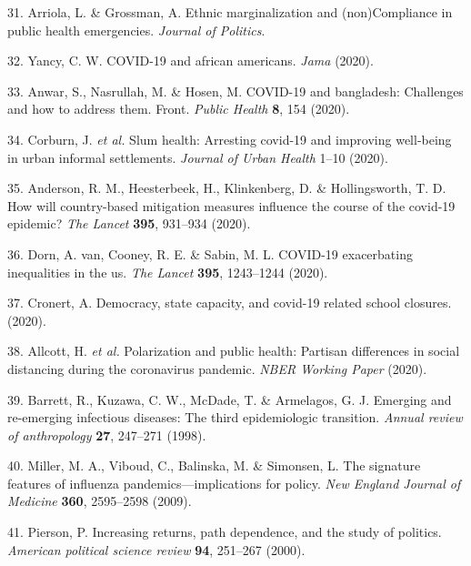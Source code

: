 \documentclass[]{article}
\begin{document}
\begin{cslreferences}
\leavevmode\hypertarget{ref-arriola2020}{}%
31. Arriola, L. \& Grossman, A. Ethnic marginalization and (non)Compliance in public health emergencies. \emph{Journal of Politics}.

\leavevmode\hypertarget{ref-yancy2020covid}{}%
32. Yancy, C. W. COVID-19 and african americans. \emph{Jama} (2020).

\leavevmode\hypertarget{ref-anwar2020covid}{}%
33. Anwar, S., Nasrullah, M. \& Hosen, M. COVID-19 and bangladesh: Challenges and how to address them. Front. \emph{Public Health} \textbf{8}, 154 (2020).

\leavevmode\hypertarget{ref-corburn2020slum}{}%
34. Corburn, J. \emph{et al.} Slum health: Arresting covid-19 and improving well-being in urban informal settlements. \emph{Journal of Urban Health} 1--10 (2020).

\leavevmode\hypertarget{ref-anderson2020will}{}%
35. Anderson, R. M., Heesterbeek, H., Klinkenberg, D. \& Hollingsworth, T. D. How will country-based mitigation measures influence the course of the covid-19 epidemic? \emph{The Lancet} \textbf{395}, 931--934 (2020).

\leavevmode\hypertarget{ref-van2020covid}{}%
36. Dorn, A. van, Cooney, R. E. \& Sabin, M. L. COVID-19 exacerbating inequalities in the us. \emph{The Lancet} \textbf{395}, 1243--1244 (2020).

\leavevmode\hypertarget{ref-cronert2020democracy}{}%
37. Cronert, A. Democracy, state capacity, and covid-19 related school closures. (2020).

\leavevmode\hypertarget{ref-allcott2020polarization}{}%
38. Allcott, H. \emph{et al.} Polarization and public health: Partisan differences in social distancing during the coronavirus pandemic. \emph{NBER Working Paper} (2020).

\leavevmode\hypertarget{ref-barrett1998emerging}{}%
39. Barrett, R., Kuzawa, C. W., McDade, T. \& Armelagos, G. J. Emerging and re-emerging infectious diseases: The third epidemiologic transition. \emph{Annual review of anthropology} \textbf{27}, 247--271 (1998).

\leavevmode\hypertarget{ref-miller2009signature}{}%
40. Miller, M. A., Viboud, C., Balinska, M. \& Simonsen, L. The signature features of influenza pandemics---implications for policy. \emph{New England Journal of Medicine} \textbf{360}, 2595--2598 (2009).

\leavevmode\hypertarget{ref-pierson2000increasing}{}%
41. Pierson, P. Increasing returns, path dependence, and the study of politics. \emph{American political science review} \textbf{94}, 251--267 (2000).


\end{cslreferences}
\end{document}
